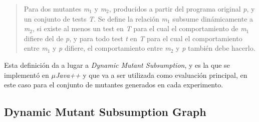 \begin{quote}
	Para dos mutantes \emph{m$_1$} y \emph{m$_2$}, producidos a partir del programa original \emph{p}, y un conjunto de tests \emph{T}. Se define la relaci\'on \emph{m$_1$} subsume din\'amicamente a \emph{m$_2$}, si existe al menos un test en \emph{T} para el cual el comportamiento de \emph{m$_1$} difiere del de \emph{p}, y para todo test \emph{t} en \emph{T} para el cual el comportamiento entre \emph{m$_1$} y \emph{p} difiere, el comportamiento entre \emph{m$_2$} y \emph{p} tambi\'en debe hacerlo.
\end{quote}
Esta definici\'on da a lugar a \emph{Dynamic Mutant Subsumption}, y es la que se implement\'o en \emph{$\mu$Java++} y que va a ser utilizada como evaluaci\'on principal, en este caso para el conjunto de mutantes generados en cada experimento.

\subsection{Dynamic Mutant Subsumption Graph}
\label{sec:implementation.dynamicSubsumption.graph}

